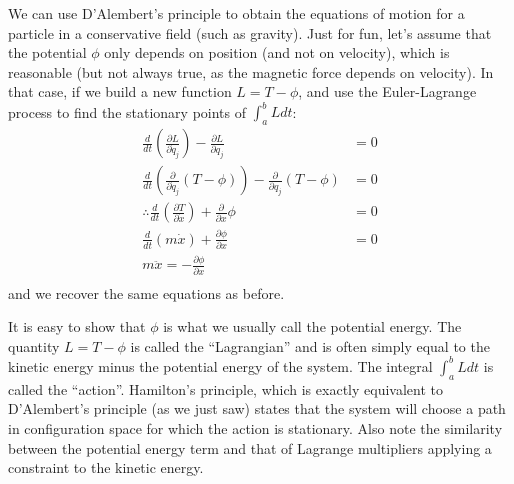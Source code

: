 \begin{example}{0pt}{We can use D'Alembert's principle to obtain the equations of motion for a particle in a conservative field (such as gravity).}{}
Just for fun, let's assume that the potential $\phi$ only depends on position (and not on velocity), which is reasonable (but not always true, as the magnetic force depends on velocity). In that case, if we build a new function $L=T-\phi$, and use the Euler-Lagrange process to find the stationary points of $\int_a^b L dt$:
\begin{align*}
\frac{d}{dt}\left(\frac{\partial L}{\partial \dot{q}_j}  \right) - \frac{\partial L}{\partial q_j} &=0\nonumber\\
\frac{d}{dt}\left(\frac{\partial}{\partial \dot{q}_j} (T-\phi) \right) - \frac{\partial }{\partial q_j} (T-\phi)&=0\nonumber\\
\therefore\frac{d}{dt}\left(\frac{\partial T}{\partial \dot{x}} \right) + \frac{\partial}{\partial x}\phi&=0\nonumber\\
\frac{d}{dt}\left(m\dot{x} \right)+\frac{\partial \phi}{\partial x}&=0\nonumber\\
m\ddot{x}=-\frac{\partial \phi}{\partial x}\nonumber\\
\end{align*}
and we recover the same equations as before.

It is easy to show that $\phi$ is what we usually call the potential energy. The quantity $L=T-\phi$ is called the ``Lagrangian'' and is often simply equal to the kinetic energy minus the potential energy of the system. The integral $\int_a^b L dt$ is called the ``action''. Hamilton's principle, which is exactly equivalent to D'Alembert's principle (as we just saw) states that the system will choose a path in configuration space for which the action is stationary. Also note the similarity between the potential energy term and that of Lagrange multipliers applying a constraint to the kinetic energy.
\label{ex:dalembpart}
\end{example}


